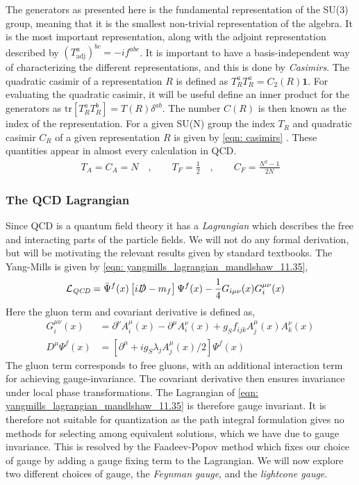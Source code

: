 \documentclass[main.tex]{subfiles}
\begin{document}
The generators as presented here is the fundamental representation of the SU(3) group, meaning that it is the smallest non-trivial representation of the algebra. It is the most important representation, along with the adjoint representation described by \((T^a_{\text{adj}})^{bc}=-if^{abc}\). It is important to have a basis-independent way of characterizing the different representations, and this is done by \emph{Casimirs}. The quadratic casimir of a representation \(R\) is defined as \(T_R^aT_R^a = C_2(R) \mathbf{1}\). For evaluating the quadratic casimir, it will be useful define an inner product for the generators as \(\text{tr}\left[T_R^aT_R^b\right]=T(R)\delta^{ab}\). The number \(C(R)\) is then known as the index of the representation. For a given SU(N) group the index \(T_R\) and quadratic casimir \(C_R\) of a given representation \(R\) is given by \autoref{eqn: casimirs} \cite[p.484-489]{schwartz2014quantum}. These quantities appear in almost every calculation in QCD. 
\begin{align}\label{eqn: casimirs}
    T_A = C_A = N \quad, \qquad T_F = \frac{1}{2}  \quad, \qquad C_F = \frac{N^2-1}{2N}
\end{align}

\subsubsection*{The QCD Lagrangian}
Since QCD is a quantum field theory it has a \emph{Lagrangian} which describes the free and interacting parts of the particle fields. We will not do any formal derivation, but will be motivating the relevant results given by standard textbooks. The Yang-Mills is given by \autoref{eqn: yangmills_lagrangian_mandlshaw_11.35}\cite{Peskin:1995ev},
\begin{align}\label{eqn: yangmills_lagrangian_mandlshaw_11.35}
    \begin{split}
    \mathcal{L}_{\textit{QCD}} &= \bar \Psi^f(x) \left[ i \slashed D -m_f\right] \Psi^f(x) - \frac{1}{4} G_{i\mu\nu}(x)G_{i}^{\mu\nu}(x)
    \end{split}
\end{align}
Here the gluon term and covariant derivative is defined as, 
\begin{align}
    G_i^{\mu\nu}(x) &= \partial^\nu A_i^\mu(x) - \partial^\mu A_i^\nu(x) + g_S f_{ijk}A_j^\mu(x)A_k^\nu(x) \\
    D^\mu \Psi^f(x) &= \left[\partial^\mu + ig_S \lambda_j A_j^\mu(x)/2 \right]\Psi^f(x)
\end{align}
The gluon term corresponds to free gluons, with an additional interaction term for achieving gauge-invariance. The covariant derivative then ensures invariance under local phase transformations\cite{mandl2010quantum}.
The Lagrangian of \autoref{eqn: yangmills_lagrangian_mandlshaw_11.35} is therefore gauge invariant. It is therefore not suitable for quantization as the path integral formulation gives no methods for selecting among equivalent solutions, which we have due to gauge invariance. This is resolved by the Faadeev-Popov method which fixes our choice of gauge by adding a gauge fixing term to the Lagrangian. We will now explore two different choices of gauge, the \emph{Feynman gauge}, and the \emph{lightcone gauge}.
\end{document}
